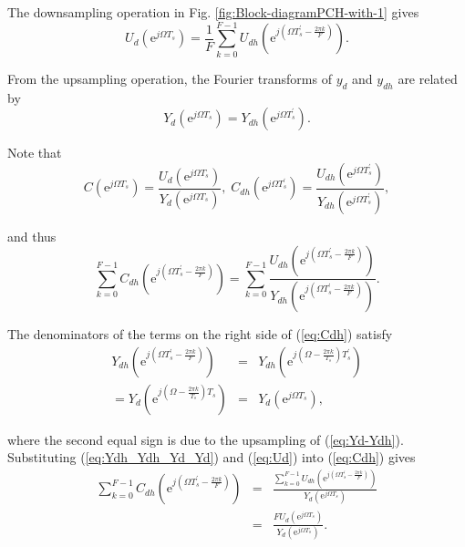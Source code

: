 \documentclass [11pt, proquest] {uwthesis}[2020/02/24]
\begin{document}
The downsampling operation in Fig. \ref{fig:Block-diagramPCH-with-1}
gives
\begin{equation}
U_{d}(\text{e}^{j\Omega T_{s}})=\frac{1}{F}\sum_{k=0}^{F-1}U_{dh}(\text{e}^{j(\Omega T_{s}^{'}-\frac{2\pi k}{F})}).\label{eq:Ud}
\end{equation}

From the upsampling operation, the Fourier transforms of $y_{d}$
and $y_{dh}$ are related by
\begin{equation}
Y_{d}(\text{e}^{j\Omega T_{s}})=Y_{dh}(\text{e}^{j\Omega T_{s}^{'}}).\label{eq:Yd-Ydh}
\end{equation}

Note that
\begin{equation}
C(\text{e}^{j\Omega T_{s}})=\frac{U_{d}(\text{e}^{j\Omega T_{s}})}{Y_{d}(\text{e}^{j\Omega T_{s}})},\;C_{dh}(\text{e}^{j\Omega T_{s}^{'}})=\frac{U_{dh}(\text{e}^{j\Omega T_{s}^{'}})}{Y_{dh}(\text{e}^{j\Omega T_{s}^{'}})},\label{eq:C_Cdh}
\end{equation}

\noindent and thus
\begin{equation}
\sum_{k=0}^{F-1}C_{dh}(\text{e}^{j(\Omega T_{s}^{'}-\frac{2\pi k}{F})})=\sum_{k=0}^{F-1}\frac{U_{dh}(\text{e}^{j(\Omega T_{s}^{'}-\frac{2\pi k}{F})})}{Y_{dh}(\text{e}^{j(\Omega T_{s}^{'}-\frac{2\pi k}{F})})}.\label{eq:Cdh}
\end{equation}

The denominators of the terms on the right side of (\ref{eq:Cdh})
satisfy
\begin{eqnarray}
Y_{dh}(\text{e}^{j(\Omega T_{s}^{'}-\frac{2\pi k}{F})}) & = & Y_{dh}(\text{e}^{j(\Omega-\frac{2\pi k}{T_{s}})T_{s}^{'}})\nonumber \\
=Y_{d}(\text{e}^{j(\Omega-\frac{2\pi k}{T_{s}})T_{s}}) & = & Y_{d}(\text{e}^{j\Omega T_{s}}),\label{eq:Ydh_Ydh_Yd_Yd}
\end{eqnarray}

\noindent where the second equal sign is due to the upsampling of
(\ref{eq:Yd-Ydh}). Substituting (\ref{eq:Ydh_Ydh_Yd_Yd}) and (\ref{eq:Ud})
into (\ref{eq:Cdh}) gives
\begin{eqnarray}
\sum_{k=0}^{F-1}C_{dh}(\text{e}^{j(\Omega T_{s}^{'}-\frac{2\pi k}{F})}) & = & \frac{\sum_{k=0}^{F-1}U_{dh}(\text{e}^{j(\Omega T_{s}^{'}-\frac{2\pi k}{F})})}{Y_{d}(\text{e}^{j\Omega T_{s}})}\nonumber \\
 & = & \frac{FU_{d}(\text{e}^{j\Omega T_{s}})}{Y_{d}(\text{e}^{j\Omega T_{s}})}.\label{eq:Cdh-sum}
\end{eqnarray}
\end{document}
